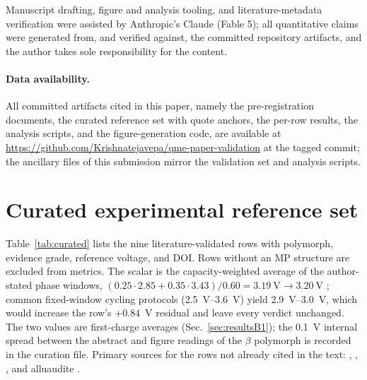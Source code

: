 \documentclass[reprint,aps,prb,amsmath,amssymb,nofootinbib,longbibliography]{revtex4-2}
\begin{document}
\begin{acknowledgments}
Manuscript drafting, figure and analysis tooling, and literature-metadata
verification were assisted by Anthropic's Claude (Fable 5); all quantitative
claims were generated from, and verified against, the committed repository
artifacts, and the author takes sole responsibility for the content.
\end{acknowledgments}

\paragraph*{Data availability.}
All committed artifacts cited in this paper, namely the pre-registration
documents, the curated reference set with quote anchors, the per-row
results, the analysis scripts, and the figure-generation code, are
available at \url{https://github.com/Krishnatejavepa/qme-paper-validation}
at the tagged commit; the ancillary files of this submission mirror the
validation set and analysis scripts.

\appendix

\section{Curated experimental reference set}
\label{app:curated}

Table~\ref{tab:curated} lists the nine literature-validated rows with
polymorph, evidence grade, reference voltage, and DOI. Rows without an MP
structure are excluded from metrics. The  scalar is the
capacity-weighted average of the author-stated phase windows,
$(0.25\cdot2.85+0.35\cdot3.43)/0.60=\SI{3.19}{\volt}\to\SI{3.20}{\volt}$
\cite{bo2016}; common fixed-window cycling protocols
(\SIrange{2.5}{3.6}{\volt}) yield \SIrange{2.9}{3.0}{\volt}, which would
increase the row's $+0.84$~V residual and leave every verdict unchanged.
The two  values are first-charge averages
(Sec.~\ref{sec:resultsB1}); the \SI{0.1}{\volt} internal spread between the
abstract and figure readings of the $\beta$ polymorph is recorded in the
curation file. Primary sources for the rows not already cited in the text:
 \cite{kim2012}, 
\cite{yan2019},  \cite{barpanda2012}, and alluaudite
 \cite{barpanda2014}.

\begin{table}[tb]
\caption{\label{tab:curated}The curated Na-ion cathode reference set.
Grade: A = author-stated average in fetched text; B = one arithmetic step
from author-stated plateaus or windows (calculation recorded); C = figure
read-off (low confidence). The maricite row is excluded from canonical
metrics by the operator audit (phase identity: the cycled phase is
amorphous). Rows marked ``no MP entry'' are literature-validated but cannot
be predicted by the structure-ingesting screen.}

\end{table}
\end{document}
